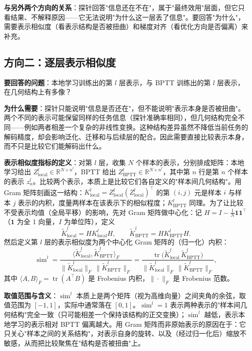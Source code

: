 \documentclass[journal,12pt,onecolumn]{IEEEtran}
\begin{document}
\textbf{与另外两个方向的关系}：探针回答"信息还在不在"，属于"最终效用"层面，但它只看结果、不解释原因——它无法说明"为什么这一层丢了信息"。要回答"为什么"，需要表示相似度（看表示结构是否被扭曲）和梯度对齐（看优化方向是否偏离）来补充。

\subsection{方向二：逐层表示相似度}

\textbf{要回答的问题}：本地学习训练出的第 $l$ 层表示，与 BPTT 训练出的第 $l$ 层表示，在几何结构上有多像？

\textbf{为什么需要}：探针只能说明"信息是否还在"，但不能说明"表示本身是否被扭曲"。两个不同的表示可能保留同样的任务信息（探针准确率相同），但几何结构完全不同——例如两者相差一个复杂的非线性变换。这种结构差异虽然不降低当前任务的解码精度，却会影响泛化、迁移和与后续层的配合。因此需要直接比较表示本身，而不只是比较它们能解码出什么。

\textbf{表示相似度指标的定义}：对第 $l$ 层，收集 $N$ 个样本的表示，分别排成矩阵：本地学习给出 $Z^l_{\mathrm{local}}\in\mathbb R^{N\times n^l}$，BPTT 给出 $Z^l_{\mathrm{BPTT}}\in\mathbb R^{N\times n^l}$，其中第 $n$ 行是第 $n$ 个样本的表示 $z^l_n$。比较两个表示，本质上是比较它们各自定义的"样本间几何结构"。用 Gram 矩阵刻画这一结构：$K^l_{\mathrm{local}} = Z^l_{\mathrm{local}}(Z^l_{\mathrm{local}})^\top$ 的第 $(i,j)$ 元是样本 $i$ 与样本 $j$ 表示的内积，度量两样本在该表示下的相似程度；$K^l_{\mathrm{BPTT}}$ 同理。为了让比较不受表示均值（全局平移）的影响，先对 Gram 矩阵做中心化：记 $H = I - \frac{1}{N}\mathbf{1}\mathbf{1}^{\top}$（$\mathbf{1}$ 为全 1 向量，$I$ 为单位阵），定义
\begin{equation}
\tilde K^l_{\mathrm{local}} = H K^l_{\mathrm{local}} H,
\qquad
\tilde K^l_{\mathrm{BPTT}} = H K^l_{\mathrm{BPTT}} H.
\end{equation}
然后定义第 $l$ 层的表示相似度为两个中心化 Gram 矩阵的（归一化）内积：
\begin{equation}
\operatorname{sim}^l = \frac{\langle \tilde K^l_{\mathrm{local}}, \tilde K^l_{\mathrm{BPTT}}\rangle_F}{\|\tilde K^l_{\mathrm{local}}\|_F\,\|\tilde K^l_{\mathrm{BPTT}}\|_F}
= \frac{\operatorname{tr}\big(\tilde K^l_{\mathrm{local}}\,\tilde K^l_{\mathrm{BPTT}}\big)}{\|\tilde K^l_{\mathrm{local}}\|_F\,\|\tilde K^l_{\mathrm{BPTT}}\|_F},
\end{equation}
其中 $\langle A,B\rangle_F=\operatorname{tr}(A^\top B)$ 是 Frobenius 内积，$\|\cdot\|_F$ 是 Frobenius 范数。

\textbf{取值范围与含义}：$\operatorname{sim}^l$ 本质上是两个矩阵（视为高维向量）之间夹角的余弦，取值范围为 $[-1,1]$，实际中通常落在 $[0,1]$。$\operatorname{sim}^l=1$ 表示两种表示的"样本间几何结构"完全一致（只可能相差一个保持该结构的正交变换）；$\operatorname{sim}^l$ 越低，表示本地学习的表示相对 BPTT 偏离越大。用 Gram 矩阵而非原始表示的原因在于：它只关心"样本之间的关系结构"，对表示自身的旋转、以及（经过归一化后）缩放不敏感，从而把比较聚焦在"结构是否被扭曲"上。
\end{document}
